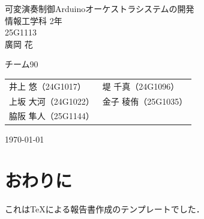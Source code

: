 \documentclass[uplatex,dvipdfmx]{jlreq}
\begin{document}
\begin{titlepage}
\vspace*{1cm}
\centering
\Huge\textsf{可変演奏制御Arduinoオーケストラシステムの開発}\\[2cm]
\Large\textsf{情報工学科 2年}\\
\Large\textsf{25G1113}\\[5pt]
\huge\textsf{廣岡 花}

\vspace*{1cm}
\Large\sffamily
\begin{itembox}[c]{チーム90}
\centering
\begin{tabular}{ll}
井上 悠（24G1017）&
堤 千真（24G1096）\\
上坂 大河（24G1022）&
金子 稜侑（25G1035）\\
脇阪 隼人（25G1144）&\\
\end{tabular}
\end{itembox}

\vspace*{1cm}
\Large\textsf{\today}
\end{titlepage}
\clearpage



%
%
%
%

\section{おわりに}
これは{\TeX}による報告書作成のテンプレートでした．

%


\appendix
\renewcommand{\thefigure}{A.\arabic{figure}} %
\renewcommand{\thetable}{A.\arabic{table}}   %
\renewcommand{\theequation}{\Alph{section}.\arabic{equation}} %

%
\end{document}

